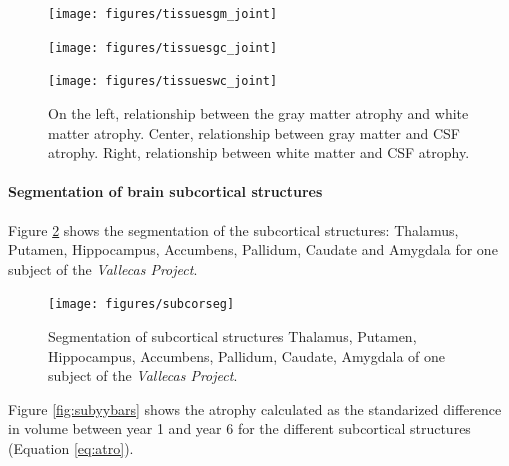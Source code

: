 \documentclass[11pt]{article}
\theoremstyle{definition}
\theoremstyle{remark}
\begin{document}
\begin{figure}[!htb]
    \centering
    \begin{minipage}{.33\textwidth}
        \centering
        \texttt{[image: figures/tissuesgm\_joint]} %
    \end{minipage}%
    \hfill
    \begin{minipage}{0.33\textwidth}
        \centering
        \texttt{[image: figures/tissuesgc\_joint]}
    \end{minipage}
    \hfill
    \begin{minipage}{0.33\textwidth}
        \centering
        \texttt{[image: figures/tissueswc\_joint]}
    \end{minipage}
    \caption{On the left, relationship between the gray matter atrophy and white matter atrophy. Center, relationship between gray matter and CSF atrophy. Right, relationship between white matter and CSF atrophy.}
    \label{fig:jointtissues}
\end{figure}


\paragraph*{Segmentation of brain subcortical structures}

Figure \ref{fig:subcorseg} shows the segmentation of the subcortical structures: Thalamus, Putamen, Hippocampus, Accumbens, Pallidum, Caudate and Amygdala for one subject of the \emph{Vallecas Project}. 

\begin{figure}[H]
        \centering
        \texttt{[image: figures/subcorseg]}
        \caption{Segmentation of subcortical structures Thalamus, Putamen, Hippocampus, Accumbens, Pallidum, Caudate, Amygdala of one subject of the \emph{Vallecas Project}. } 
        \label{fig:subcorseg}
\end{figure}

Figure \ref{fig:subyybars} shows the atrophy calculated as the standarized difference in volume between year 1 and year 6 for the different subcortical structures (Equation \ref{eq:atro}).
\end{document}
